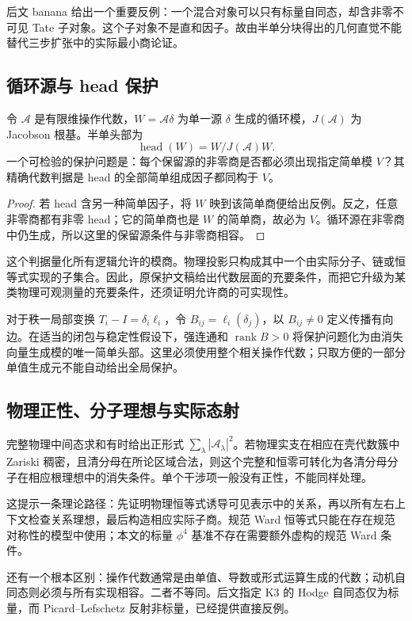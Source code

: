 \documentclass[11pt,a4paper,oneside]{ctexart}
\theoremstyle{cnplain}
\theoremstyle{definition}
\theoremstyle{remark}
\newcommand{\rank}{\operatorname{rank}}
\numberwithin{equation}{section}
\begin{document}
后文 banana 给出一个重要反例：一个混合对象可以只有标量自同态，却含非零不可见 Tate 子对象。这个子对象不是直和因子。故由半单分块得出的几何直觉不能替代三步扩张中的实际最小商论证。


\subsection{循环源与 head 保护}
令 $\mathcal A$ 是有限维操作代数，$W=\mathcal A\delta$ 为单一源 $\delta$ 生成的循环模，$J(\mathcal A)$ 为 Jacobson 根基。半单头部为
\begin{equation}
 \operatorname{head}(W)=W/J(\mathcal A)W.
\end{equation}
一个可检验的保护问题是：每个保留源的非零商是否都必须出现指定简单模 $V$？其精确代数判据是 head 的全部简单组成因子都同构于 $V$。

\begin{proof}
若 head 含另一种简单因子，将 $W$ 映到该简单商便给出反例。反之，任意非零商都有非零 head；它的简单商也是 $W$ 的简单商，故必为 $V$。循环源在非零商中仍生成，所以这里的保留源条件与非零商相容。
\end{proof}

这个判据量化所有逻辑允许的模商。物理投影只构成其中一个由实际分子、链或恒等式实现的子集合。因此，原保护文稿给出代数层面的充要条件，而把它升级为某类物理可观测量的充要条件，还须证明允许商的可实现性。

对于秩一局部变换 $T_i-I=\delta_i\ell_i$，令 $B_{ij}=\ell_i(\delta_j)$，以 $B_{ij}\ne0$ 定义传播有向边。在适当的闭包与稳定性假设下，强连通和 $\rank B>0$ 将保护问题化为由消失向量生成模的唯一简单头部。这里必须使用整个相关操作代数；只取方便的一部分单值生成元不能自动给出全局保护。


\subsection{物理正性、分子理想与实际态射}
完整物理中间态求和有时给出正形式 $\sum_\lambda|\mathcal A_\lambda|^2$。若物理实支在相应在壳代数簇中 Zariski 稠密，且清分母在所论区域合法，则这个完整和恒零可转化为各清分母分子在相应根理想中的消失条件。单个干涉项一般没有正性，不能同样处理。

这提示一条理论路径：先证明物理恒等式诱导可见表示中的关系，再以所有左右上下文检查关系理想，最后构造相应实际子商。规范 Ward 恒等式只能在存在规范对称性的模型中使用；本文的标量 $\phi^4$ 基准不存在需要额外虚构的规范 Ward 条件。

还有一个根本区别：操作代数通常是由单值、导数或形式运算生成的代数；动机自同态则必须与所有实现相容。二者不等同。后文指定 K3 的 Hodge 自同态仅为标量，而 Picard--Lefschetz 反射非标量，已经提供直接反例。
\end{document}
